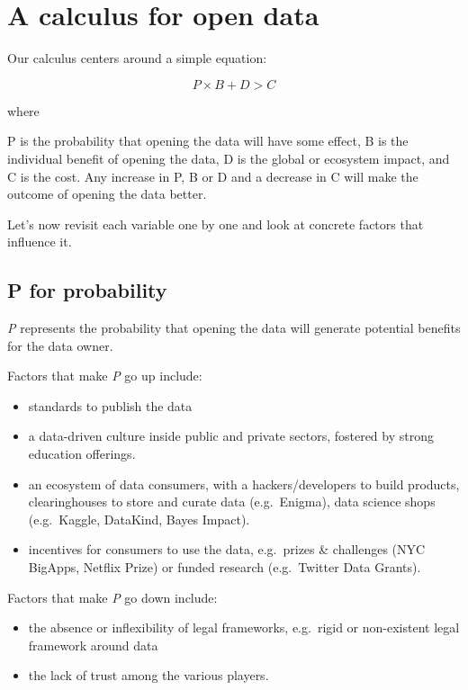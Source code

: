 \documentclass[]{acm_proc_article-sp}
\begin{document}
\section{A calculus for open data}\label{a-calculus-for-open-data}

Our calculus centers around a simple equation:

\begin{equation}
P \times B + D > C
\end{equation}

where

P is the probability that opening the data will have some effect, B is
the individual benefit of opening the data, D is the global or ecosystem
impact, and C is the cost. Any increase in P, B or D and a decrease in C
will make the outcome of opening the data better.

Let's now revisit each variable one by one and look at concrete factors
that influence it.

\subsection{P for probability}\label{p-for-probability}

\emph{P} represents the probability that opening the data will generate
potential benefits for the data owner.

Factors that make \emph{P} go up include: \vspace{0mm}

\begin{itemize}
\itemsep1pt\parskip0pt
\item
  standards to publish the data
\item
  a data-driven culture inside public and private sectors, fostered by
  strong education offerings.
\item
  an ecosystem of data consumers, with a hackers/developers to build
  products, clearinghouses to store and curate data (e.g.~Enigma), data
  science shops (e.g.~Kaggle, DataKind, Bayes Impact).
\item
  incentives for consumers to use the data, e.g.~prizes \& challenges
  (NYC BigApps, Netflix Prize) or funded research (e.g.~Twitter Data
  Grants).
\end{itemize}

Factors that make \emph{P} go down include: \vspace{0mm}

\begin{itemize}
\itemsep1pt\parskip0pt
\item
  the absence or inflexibility of legal frameworks, e.g.~rigid or
  non-existent legal framework around data
\item
  the lack of trust among the various players.
\end{itemize}
\end{document}
